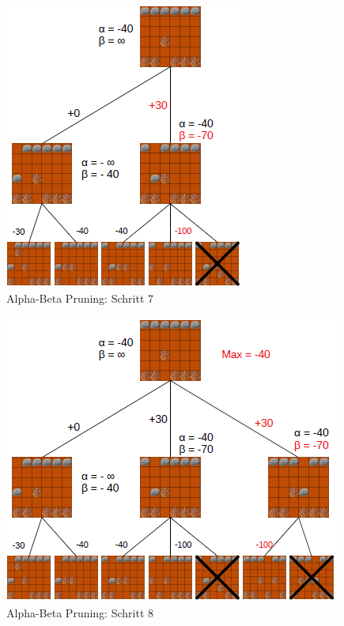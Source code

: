 \begin{figure}[h]
	\centering
	\includegraphics{img/ab7}
	\caption{Alpha-Beta Pruning: Schritt 7}
	\label{fig:ab7}
\end{figure}
\begin{figure}[h]
	\centering
	\includegraphics{img/ab8}
	\caption{Alpha-Beta Pruning: Schritt 8}
	\label{fig:ab8}
\end{figure}



